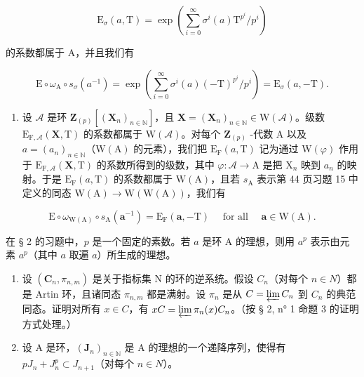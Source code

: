 \[
\mathrm{E} _ {\sigma} (a, \mathrm{T}) = \exp (\sum_ {i = 0} ^ {\infty} \sigma^ {i} (a) \mathrm{T} ^ {p ^ {i}} / p ^ {i})
\]

的系数都属于 A，并且我们有

\[
\mathrm{E} \circ \omega_ {\mathrm{A}} \circ s _ {\sigma} (a ^ {- 1}) = \exp \left(\sum_ {i = 0} ^ {\infty} \sigma^ {i} (a) (- \mathrm{T}) ^ {p ^ {i}} / p ^ {i}\right) = \mathrm{E} _ {\sigma} (a, - \mathrm{T}).
\]

\begin{enumerate}
\def\labelenumi{\alph{enumi})}
\setcounter{enumi}{5}
\tightlist
\item
  设 \(\mathcal{A}\) 是环 \(\mathbf{Z}_{(p)}[(\mathbf{X}_n)_{n\in\mathbb{N}}]\)，且 \(\mathbf{X} = (\mathbf{X}_n)_{n\in\mathbb{N}} \in \mathrm{W}(\mathcal{A})\)。级数 \(\mathrm{E}_{\mathrm{F},\mathcal{A}}(\mathbf{X},\mathrm{T})\) 的系数都属于 \(\mathrm{W}(\mathcal{A})\)。对每个 \(\mathbf{Z}_{(p)}\) -代数 A 以及 \(a = (a_n)_{n\in\mathbb{N}}\)（\(\mathrm{W}(\mathrm{A})\) 的元素），我们把 \(\mathrm{E}_{\mathrm{F}}(a,\mathrm{T})\) 记为通过 \(\mathrm{W}(\varphi)\) 作用于 \(\mathrm{E}_{\mathrm{F},\mathcal{A}}(\mathbf{X},\mathrm{T})\) 的系数所得到的级数，其中 \(\varphi: \mathcal{A} \to \mathrm{A}\) 是把 \(\mathrm{X}_n\) 映到 \(a_n\) 的映射。于是 \(\mathrm{E}_{\mathrm{F}}(a,\mathrm{T})\) 的系数都属于 \(\mathrm{W}(\mathrm{A})\)，且若 \(s_{\mathrm{A}}\) 表示第 44 页习题 15 中定义的同态 \(\mathrm{W}(\mathrm{A}) \to \mathrm{W}(\mathrm{W}(\mathrm{A}))\)，我们有
\end{enumerate}

\[
\mathrm{E} \circ \omega_ {\mathrm{W(A)}} \circ s _ {\mathrm{A}} (\boldsymbol {a} ^ {- 1}) = \mathrm{E} _ {\mathrm{F}} (\boldsymbol {a}, - \mathrm{T}) \quad \text { for all } \quad \boldsymbol {a} \in \mathrm{W(A)}.
\]


在 § 2 的习题中，\(p\) 是一个固定的素数。若 \(a\) 是环 A 的理想，则用 \(a^p\) 表示由元素 \(a^p\)（其中 \(a\) 取遍 \(a\)）所生成的理想。

\begin{enumerate}
\def\labelenumi{\arabic{enumi})}
\item
  设 \((\mathbf{C}_{n}, \pi_{n,m})\) 是关于指标集 N 的环的逆系统。假设 \(C_{n}\)（对每个 \(n \in N\)）都是 Artin 环，且诸同态 \(\pi_{n,m}\) 都是满射。设 \(\pi_{n}\) 是从 \(C = \varprojlim C_{n}\) 到 \(C_{n}\) 的典范同态。证明对所有 \(x \in C\)，有 \(xC = \varprojlim \pi_{n}(x) C_{n}\)。（按 § 2, n° 1 命题 3 的证明方式处理。）
\item
  设 A 是环，\((\mathbf{J}_{n})_{n\in\mathbb{N}}\) 是 A 的理想的一个递降序列，使得有 \(pJ_{n} + J_{n}^{p} \subset J_{n+1}\)（对每个 \(n \in N\)）。
\end{enumerate}

